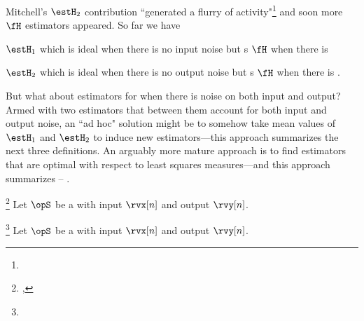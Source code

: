 Mitchell's $\estH_2$ contribution ``generated a flurry of activity"\footnote{}
and soon more $\fH$ estimators appeared. 
So far we have 
\begin{listi}
  \item $\estH_1$ which is ideal when there is no input noise but 
        s $\fH$ when there is 
  \item $\estH_2$ which is ideal when there is no output noise but
        s $\fH$ when there is .
\end{listi}
But what about estimators for when there is noise on both input and output?
Armed with two estimators that between them account for both input and output noise,
an ``ad hoc" solution might be to somehow take mean values of $\estH_1$ and $\estH_2$ 
to induce new estimators---this approach summarizes the next three definitions.
An arguably more mature approach is to find estimators that are optimal with respect to least squares measures---and
this approach summarizes  -- .

\begin{definition}
\footnote{
  ,
  }
\label{def:Havg}
Let $\opS$ be a  with input $\rvx[n]$ and output $\rvy[n]$.
\end{definition}

\begin{definition}
\footnote{
  }
\label{def:Hgm}
Let $\opS$ be a  with input $\rvx[n]$ and output $\rvy[n]$.
\end{definition}

